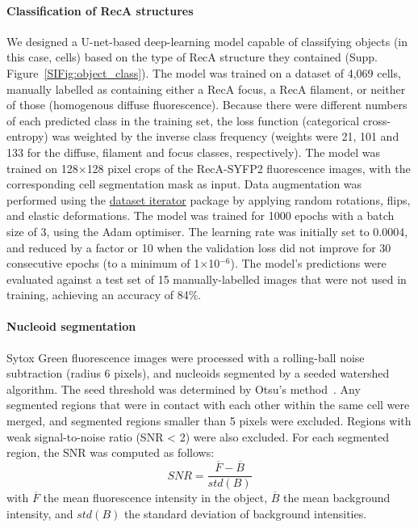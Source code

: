 \paragraph*{Classification of RecA structures}
We designed a U-net-based deep-learning model capable of classifying objects (in this case, cells) based on the type of RecA structure they contained (Supp. Figure~\ref{SIFig:object_class}). The model was trained on a dataset of 4,069 cells, manually labelled as containing either a RecA focus, a RecA filament, or neither of those (homogenous diffuse fluorescence). Because there were different numbers of each predicted class in the training set, the loss function (categorical cross-entropy) was weighted by the inverse class frequency (weights were 21, 101 and 133 for the diffuse, filament and focus classes, respectively). The model was trained on 128$\times$128 pixel crops of the RecA-SYFP2 fluorescence images, with the corresponding cell segmentation mask as input. Data augmentation was performed using the \href{https://github.com/jeanollion/dataset_iterator}{dataset iterator} package by applying random rotations, flips, and elastic deformations. The model was trained for 1000 epochs with a batch size of 3, using the Adam optimiser. The learning rate was initially set to 0.0004, and reduced by a factor or 10 when the validation loss did not improve for 30 consecutive epochs (to a minimum of 1$\times$10$^{-6}$). The model's predictions were evaluated against a test set of 15 manually-labelled images that were not used in training, achieving an accuracy of 84\%.

\paragraph*{Nucleoid segmentation}
Sytox Green fluorescence images were processed with a rolling-ball noise subtraction (radius 6 pixels), and nucleoids segmented by a seeded watershed algorithm. The seed threshold was determined by Otsu's method~\cite{Otsu1979}. Any segmented regions that were in contact with each other within the same cell were merged, and segmented regions smaller than 5 pixels were excluded. Regions with weak signal-to-noise ratio (SNR < 2) were also excluded. For each segmented region, the SNR was computed as follows:
\begin{equation}
    SNR = \dfrac{\overline{F}-\overline{B}}{std(B)}
\end{equation}
with $\overline{F}$ the mean fluorescence intensity in the object, $\overline{B}$ the mean background intensity, and $std(B)$ the standard deviation of background intensities.

